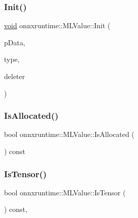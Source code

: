 \subsubsection{\texorpdfstring{Init()}{Init()}}
{\footnotesize\ttfamily \mbox{\hyperlink{mlasi_8h_a88f941d423cb2a819b70a1358982b1a6}{void}} onnxruntime\+::\+M\+L\+Value\+::\+Init (\begin{DoxyParamCaption}\item[{\mbox{\hyperlink{mlasi_8h_a88f941d423cb2a819b70a1358982b1a6}{void}} $\ast$}]{p\+Data,  }\item[{\mbox{\hyperlink{namespaceonnxruntime_ad77d0a6e838ec7da5dc35fed5ee66b49}{M\+L\+Data\+Type}}}]{type,  }\item[{\mbox{\hyperlink{namespaceonnxruntime_a8dcea0e1aa8476e3d09d5a44a0ca4516}{Delete\+Func}}}]{deleter }\end{DoxyParamCaption})\hspace{0.3cm}{\ttfamily [inline]}}

\mbox{\label{classonnxruntime_1_1MLValue_ad4f380ab452877a2d689b6d384e80617}} 
\subsubsection{\texorpdfstring{Is\+Allocated()}{IsAllocated()}}
{\footnotesize\ttfamily bool onnxruntime\+::\+M\+L\+Value\+::\+Is\+Allocated (\begin{DoxyParamCaption}{ }\end{DoxyParamCaption}) const\hspace{0.3cm}{\ttfamily [inline]}}

\mbox{\label{classonnxruntime_1_1MLValue_a82f40a677063136a312807bb47789c7d}} 
\subsubsection{\texorpdfstring{Is\+Tensor()}{IsTensor()}}
{\footnotesize\ttfamily bool onnxruntime\+::\+M\+L\+Value\+::\+Is\+Tensor (\begin{DoxyParamCaption}{ }\end{DoxyParamCaption}) const\hspace{0.3cm}{\ttfamily [inline]}, {\ttfamily [noexcept]}}

